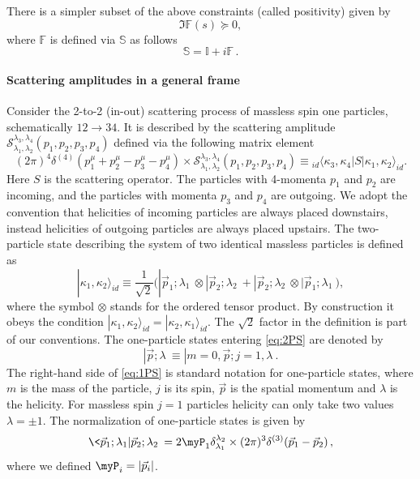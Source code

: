There is a simpler subset of the above constraints (called positivity) given by
\begin{equation}
	\Im \mathbb F (s) \succeq 0,
\end{equation}
where  $\mathbb F $ is defined via $\mathbb S $ as follows
\begin{equation}
	\mathbb S  = \mathbb I +i \mathbb F \,.
\end{equation}

\paragraph{Scattering amplitudes in a general frame}
Consider the 2-to-2 (in-out) scattering process of massless spin one particles, schematically $12\rightarrow 34$. It is described by the scattering amplitude $	\mathcal{S}{}_{\lambda_1, \lambda_2}^{\lambda_3,\lambda_4}(p_1,p_2,p_3,p_4)$ defined via the following matrix element
\begin{equation}
	\label{eq:scattering_amplitude}
	(2\pi)^4\delta^{(4)}(p_1^\mu + p_2^\mu - p_3^\mu - p_4^\mu) \times
	\mathcal{S}{}_{\lambda_1, \lambda_2}^{\lambda_3,\lambda_4}(p_1,p_2,p_3,p_4)\equiv
	{}_{id}\langle\kappa_3,\kappa_4|S|\kappa_1,\kappa_2\rangle_{id}.
\end{equation}
Here $S$ is the scattering operator.  The particles with 4-momenta $p_1$ and $p_2$ are incoming, and the particles with momenta $p_3$ and $p_4$ are outgoing. We adopt the convention that helicities of incoming particles are always placed downstairs, instead helicities of outgoing particles are always placed upstairs. The two-particle state describing the system of two identical massless particles is defined as
\begin{equation}
	\label{eq:2PS}
	|\kappa_1,\kappa_2\rangle_{id} \equiv \frac{1}{\sqrt 2}\big(
	|\vec p_1; \lambda_1\>\otimes |\vec p_2; \lambda_2\>+
	|\vec p_2; \lambda_2\>\otimes |\vec p_1; \lambda_1\>\big),
\end{equation}
where the symbol $\otimes$ stands for the ordered tensor product.  By construction it obeys the condition $|\kappa_1,\kappa_2\rangle_{id}=|\kappa_2,\kappa_1\rangle_{id}$. The $\sqrt{2}$ factor in the definition is part of our conventions. The one-particle states entering \eqref{eq:2PS} are denoted by
\begin{equation}
	\label{eq:1PS}
	|\vec p; \lambda\>\equiv |m=0,\vec p; j=1,\lambda\>.
\end{equation}
The right-hand side of \eqref{eq:1PS} is standard notation for one-particle states, where $m$ is the mass of the particle, $j$ is its spin, $\vec p$ is the spatial momentum and $\lambda$ is the helicity. For massless spin $j=1$ particles helicity can only take two values $\lambda=\pm 1$.
The normalization of one-particle states is given by
\begin{equation}
	\label{eq:normalization_1PS}
	\<\vec p_1; \lambda_1|\vec p_2; \lambda_2\> = 2\myP_1 \delta_{\lambda_1}^{\lambda_2}
	\times(2\pi)^3\delta^{(3)}(\vec p_1-\vec p_2)\,,
\end{equation}
where we defined $\myP_i = |\vec{p}_i|$.

